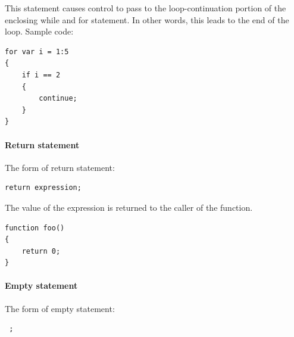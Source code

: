 \documentclass[12pt]{article} %
\begin{document}
\noindent This statement causes control to pass to the loop-continuation portion of the enclosing while and for statement. In other words, this leads to the end of the loop. Sample code:

\begin{lstlisting}
for var i = 1:5
{
	if i == 2
	{
		continue;
	}
}
\end{lstlisting}


\paragraph{Return statement}
The form of return statement:
\begin{lstlisting}
return expression;
\end{lstlisting}
The value of the expression is returned to the caller of the function.   


\begin{lstlisting}
function foo()
{
	return 0;
}
\end{lstlisting}

\paragraph{Empty statement}
The form of empty statement:

\begin{lstlisting}
 ;
\end{lstlisting}

 
\end{document}
